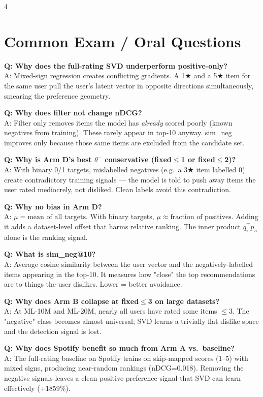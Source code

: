 \documentclass[9pt,a4paper,landscape]{article}
\begin{document}
\begin{multicols}{4}
\section{Common Exam / Oral Questions}

\textbf{Q: Why does the full-rating SVD underperform positive-only?}\\
A: Mixed-sign regression creates conflicting gradients. A 1★ and a 5★ item for the same user pull the user's latent vector in opposite directions simultaneously, smearing the preference geometry.

\textbf{Q: Why does filter not change nDCG?}\\
A: Filter only removes items the model has \emph{already} scored poorly (known negatives from training). These rarely appear in top-10 anyway. sim\_neg improves only because those same items are excluded from the candidate set.

\textbf{Q: Why is Arm D's best $\theta^-$ conservative (fixed$\leq$1 or fixed$\leq$2)?}\\
A: With binary 0/1 targets, mislabelled negatives (e.g.\ a 3★ item labelled 0) create contradictory training signals — the model is told to push away items the user rated mediocrely, not disliked. Clean labels avoid this contradiction.

\textbf{Q: Why no bias in Arm D?}\\
A: $\mu = \text{mean of all targets}$. With binary targets, $\mu \approx \text{fraction of positives}$. Adding it adds a dataset-level offset that harms relative ranking. The inner product $q_i^\top p_u$ alone is the ranking signal.

\textbf{Q: What is sim\_neg@10?}\\
A: Average cosine similarity between the user vector and the negatively-labelled items appearing in the top-10. It measures how "close" the top recommendations are to things the user dislikes. Lower = better avoidance.

\textbf{Q: Why does Arm B collapse at fixed$\leq$3 on large datasets?}\\
A: At ML-10M and ML-20M, nearly all users have rated some items $\leq$3. The "negative" class becomes almost universal; SVD learns a trivially flat dislike space and the detection signal is lost.

\textbf{Q: Why does Spotify benefit so much from Arm A vs.\ baseline?}\\
A: The full-rating baseline on Spotify trains on skip-mapped scores (1–5) with mixed signs, producing near-random rankings (nDCG=0.018). Removing the negative signals leaves a clean positive preference signal that SVD can learn effectively (+1859\%).

\end{multicols}
\end{document}
